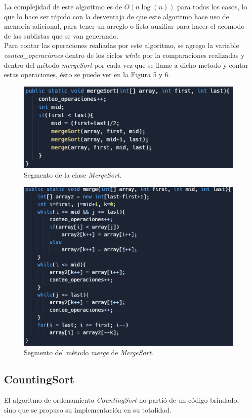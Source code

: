 \documentclass[a4paper,12pt]{article}
\begin{document}
La complejidad de este algoritmo es de $O(n\log(n))$ para todos los casos, lo que lo hace ser rápido con la desventaja de que este algoritmo hace uso de memoria adicional, para tener un arreglo o lista auxiliar para hacer el acomodo de las sublistas que se van generando.\\

Para contar las operaciones realiadas por este algoritmo, se agrego la variable \textit{conteo\_operaciones} dentro de los ciclos \textit{while} por la comparaciones realizadas y dentro del método \textit{mergeSort} por cada vez que se llame a dicho metodo y contar estas operaciones, ésto se puede ver en la Figura 5 y 6.

\begin{figure}[h]
    \centering
    \includegraphics[width=0.5\linewidth]{media/mergesort.png}
    \caption{Segmento de la clase \textit{MergeSort}.}
    \label{fig:merge1}
\end{figure}

\begin{figure}[h]
    \centering
    \includegraphics[width=0.5\linewidth]{media/merge.png}
    \caption{Segmento del método \textit{merge} de \textit{MergeSort}.}
    \label{fig:merge2}
\end{figure}

\subsection{CountingSort}

El algoritmo de ordenamiento \textit{CountingSort} no partió de un código brindado, sino que se propuso su implementación en su totalidad.\\
\end{document}

